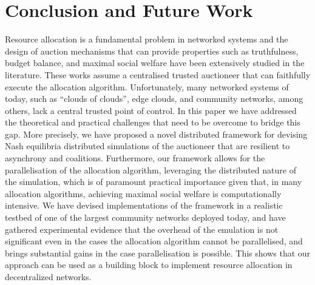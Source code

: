 
\section{Conclusion and Future Work}
\label{sec:conclusion}

Resource allocation is a fundamental problem in networked systems and the design of auction mechanisms that can provide properties such as
truthfulness, budget balance, and maximal social welfare have been extensively studied in the literature. 
These works assume a centralised trusted auctioneer that can faithfully execute the allocation algorithm. 
Unfortunately, many networked systems of today, such as ``clouds of clouds'', edge clouds, and community networks, among others, lack a central trusted point of control. 
In this paper we have addressed the theoretical and practical challenges that need to be overcome to bridge this gap. 
More precisely, we have proposed a novel distributed framework for devising Nash equilibria 
distributed simulations of the auctioneer that are resilient to asynchrony and coalitions. 
Furthermore, our framework allows for the parallelisation of the allocation algorithm, 
leveraging the distributed nature of the simulation, which is of paramount practical importance given that, 
in many allocation algorithms, achieving maximal social welfare is computationally intensive. 
We have devised implementations of the framework in a realistic testbed of one of the largest community networks deployed today, 
and have gathered experimental evidence that the overhead of the emulation 
is not significant even in the cases the allocation algorithm cannot be parallelised, 
and brings substantial gains in the case parallelisation is possible. 
This shows that our approach can be used as a building block to implement resource allocation in decentralized networks.
